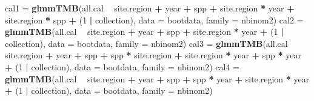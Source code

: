 \documentclass[]{article}
\newenvironment{Shaded}{\begin{snugshade}}{\end{snugshade}}
\newcommand{\KeywordTok}[1]{\textcolor[rgb]{0.13,0.29,0.53}{\textbf{#1}}}
\newcommand{\DataTypeTok}[1]{\textcolor[rgb]{0.13,0.29,0.53}{#1}}
\newcommand{\DecValTok}[1]{\textcolor[rgb]{0.00,0.00,0.81}{#1}}
\newcommand{\StringTok}[1]{\textcolor[rgb]{0.31,0.60,0.02}{#1}}
\newcommand{\OperatorTok}[1]{\textcolor[rgb]{0.81,0.36,0.00}{\textbf{#1}}}
\newcommand{\NormalTok}[1]{#1}
\begin{document}
\begin{Shaded}
\begin{Highlighting}[]
{{{{{{{{{{{{{{{{{{{{{{{{{{{{{{{{{{{{{{{{{{{{{{{{{{{{{{{{{{{{{{{{{{{{{{{{{\NormalTok{  cal1 =}\StringTok{ }\KeywordTok{glmmTMB}\NormalTok{(all.cal }\OperatorTok{~}\StringTok{ }\NormalTok{site.region }\OperatorTok{+}\StringTok{ }\NormalTok{year }\OperatorTok{+}\StringTok{ }\NormalTok{spp }\OperatorTok{+}\StringTok{ }
\StringTok{                   }\NormalTok{site.region }\OperatorTok{*}\StringTok{ }\NormalTok{year }\OperatorTok{+}\StringTok{ }\NormalTok{site.region }\OperatorTok{*}\StringTok{ }\NormalTok{spp }\OperatorTok{+}
\StringTok{                   }\NormalTok{(}\DecValTok{1} \OperatorTok{|}\StringTok{ }\NormalTok{collection), }\DataTypeTok{data =}\NormalTok{ bootdata, }\DataTypeTok{family =}\NormalTok{ nbinom2) }
\NormalTok{  cal2 =}\StringTok{ }\KeywordTok{glmmTMB}\NormalTok{(all.cal }\OperatorTok{~}\StringTok{ }\NormalTok{site.region }\OperatorTok{+}\StringTok{ }\NormalTok{year }\OperatorTok{+}\StringTok{ }\NormalTok{spp }\OperatorTok{+}\StringTok{ }
\StringTok{                   }\NormalTok{site.region }\OperatorTok{*}\StringTok{ }\NormalTok{year }\OperatorTok{+}\StringTok{ }
\StringTok{                   }\NormalTok{(}\DecValTok{1} \OperatorTok{|}\StringTok{ }\NormalTok{collection), }\DataTypeTok{data =}\NormalTok{ bootdata, }\DataTypeTok{family =}\NormalTok{ nbinom2) }
\NormalTok{  cal3 =}\StringTok{ }\KeywordTok{glmmTMB}\NormalTok{(all.cal }\OperatorTok{~}\StringTok{ }\NormalTok{site.region }\OperatorTok{+}\StringTok{ }\NormalTok{year }\OperatorTok{+}\StringTok{ }\NormalTok{spp }\OperatorTok{+}\StringTok{ }
\StringTok{                   }\NormalTok{spp }\OperatorTok{*}\StringTok{ }\NormalTok{site.region }\OperatorTok{+}\StringTok{ }\NormalTok{site.region }\OperatorTok{*}\StringTok{ }\NormalTok{year }\OperatorTok{+}\StringTok{ }\NormalTok{spp }\OperatorTok{*}\StringTok{ }\NormalTok{year }\OperatorTok{+}\StringTok{ }
\StringTok{                   }\NormalTok{(}\DecValTok{1} \OperatorTok{|}\StringTok{ }\NormalTok{collection), }\DataTypeTok{data =}\NormalTok{ bootdata, }\DataTypeTok{family =}\NormalTok{ nbinom2) }
\NormalTok{  cal4 =}\StringTok{ }\KeywordTok{glmmTMB}\NormalTok{(all.cal }\OperatorTok{~}\StringTok{ }\NormalTok{site.region }\OperatorTok{+}\StringTok{ }\NormalTok{year }\OperatorTok{+}\StringTok{ }\NormalTok{spp }\OperatorTok{+}\StringTok{ }
\StringTok{                   }\NormalTok{spp }\OperatorTok{*}\StringTok{ }\NormalTok{year }\OperatorTok{+}\StringTok{ }\NormalTok{site.region }\OperatorTok{*}\StringTok{ }\NormalTok{year }\OperatorTok{+}\StringTok{ }
\StringTok{                   }\NormalTok{(}\DecValTok{1} \OperatorTok{|}\StringTok{ }\NormalTok{collection), }\DataTypeTok{data =}\NormalTok{ bootdata, }\DataTypeTok{family =}\NormalTok{ nbinom2)}
}}}}}}}}}}}}}}}}}}}}}}}}}}}}}}}}}}}}}}}}}}}}}}}}}}}}}}}}}}}}}}}}}}}}}}}}}
\end{Highlighting}
\end{Shaded}
\end{document}

